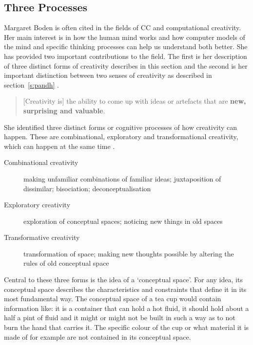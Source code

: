\subsection{Three Processes}
\label{s:boden}

Margaret Boden is often cited in the fields of \acf{CC} and computational creativity. Her main interest is in how the human mind works and how computer models of the mind and specific thinking processes can help us understand both better. She has provided two important contributions to the field. The first is her description of three distinct forms of creativity describes in this section and the second is her important distinction between two senses of creativity as described in section~\ref{s:pandh} \autocite{Boden2003}.

\begin{quotation}
  [Creativity is] the ability to come up with ideas or artefacts that are \textbf{new, surprising and valuable}. 
\end{quotation}

She identified three distinct forms or cognitive processes of how creativity can happen. These are combinational, exploratory and transformational creativity, which can happen at the same time \autocite{Boden2003}.

\begin{description}
  \item [Combinational creativity] making unfamiliar combinations of familiar ideas; juxtaposition of dissimilar; bisociation; deconceptualisation
  \item [Exploratory creativity] exploration of conceptual spaces; noticing new things in old spaces
  \item [Transformative creativity] transformation of space; making new thoughts possible by altering the rules of old conceptual space
\end{description}

Central to these three forms is the idea of a `conceptual space'. For any idea, its conceptual space describes the characteristics and constraints that define it in its most fundamental way. The conceptual space of a tea cup would contain information like: it is a container that can hold a hot fluid, it should hold about a half a pint of fluid and it might or might not be built in such a way as to not burn the hand that carries it. The specific colour of the cup or what material it is made of for example are not contained in its conceptual space.

